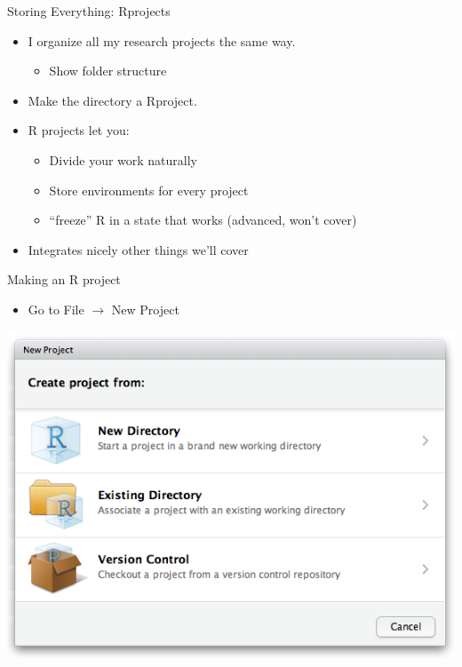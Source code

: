 \documentclass[ignorenonframetext,]{beamer}
\providecommand{\tightlist}{%
  \setlength{\itemsep}{0pt}\setlength{\parskip}{0pt}}
\begin{document}
\begin{frame}{Storing Everything: Rprojects}
\protect\hypertarget{storing-everything-rprojects}{}

\begin{itemize}
\item
  I organize all my research projects the same way.

  \begin{itemize}
  \tightlist
  \item
    Show folder structure
  \end{itemize}
\item
  Make the directory a Rproject.
\item
  R projects let you:

  \begin{itemize}
  \tightlist
  \item
    Divide your work naturally
  \item
    Store environments for every project
  \item
    “freeze” R in a state that works (advanced, won’t cover)
  \end{itemize}
\item
  Integrates nicely other things we’ll cover
\end{itemize}

\end{frame}

\begin{frame}{Making an R project}
\protect\hypertarget{making-an-r-project}{}

\begin{itemize}
\tightlist
\item
  Go to File \(\rightarrow\) New Project
\end{itemize}

\begin{center}
  \includegraphics[width=\textwidth,height= .90\textheight,keepaspectratio]{projects_new.png}
\end{center}

\end{frame}
\end{document}
